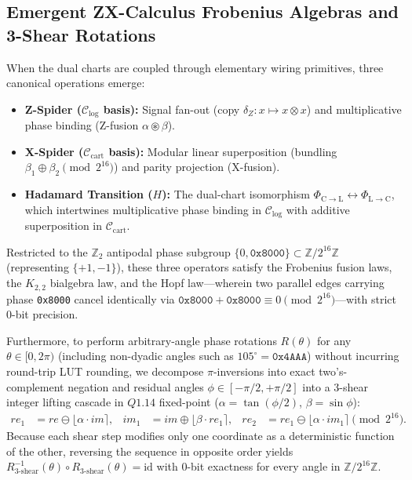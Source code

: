 \documentclass[11pt, a4paper]{article}
\begin{document}
\subsection{Emergent ZX-Calculus Frobenius Algebras and 3-Shear Rotations}
When the dual charts are coupled through elementary wiring primitives, three canonical operations emerge:
\begin{itemize}
    \item \textbf{Z-Spider ($\mathcal{C}_{\mathrm{log}}$ basis):} Signal fan-out (copy $\delta_Z: x \mapsto x \otimes x$) and multiplicative phase binding (Z-fusion $\alpha \circledast \beta$).
    \item \textbf{X-Spider ($\mathcal{C}_{\mathrm{cart}}$ basis):} Modular linear superposition (bundling $\beta_1 \oplus \beta_2 \pmod{2^{16}}$) and parity projection (X-fusion).
    \item \textbf{Hadamard Transition ($H$):} The dual-chart isomorphism $\Phi_{\mathrm{C}\to\mathrm{L}} \leftrightarrow \Phi_{\mathrm{L}\to\mathrm{C}}$, which intertwines multiplicative phase binding in $\mathcal{C}_{\mathrm{log}}$ with additive superposition in $\mathcal{C}_{\mathrm{cart}}$.
\end{itemize}
Restricted to the $\mathbb{Z}_2$ antipodal phase subgroup $\{0, \texttt{0x8000}\} \subset \mathbb{Z}/2^{16}\mathbb{Z}$ (representing $\{+1, -1\}$), these three operators satisfy the Frobenius fusion laws, the $K_{2,2}$ bialgebra law, and the Hopf law---wherein two parallel edges carrying phase \texttt{0x8000} cancel identically via $\texttt{0x8000} + \texttt{0x8000} \equiv 0 \pmod{2^{16}}$---with strict 0-bit precision.

Furthermore, to perform arbitrary-angle phase rotations $R(\theta)$ for any $\theta \in [0, 2\pi)$ (including non-dyadic angles such as $105^\circ = \texttt{0x4AAA}$) without incurring round-trip LUT rounding, we decompose $\pi$-inversions into exact two's-complement negation and residual angles $\phi \in [-\pi/2, +\pi/2]$ into a 3-shear integer lifting cascade in $Q1.14$ fixed-point ($\alpha = \tan(\phi/2)$, $\beta = \sin\phi$):
\begin{align*}
    re_1 &= re \ominus \lfloor \alpha \cdot im \rceil, &
    im_1 &= im \oplus \lfloor \beta \cdot re_1 \rceil, &
    re_2 &= re_1 \ominus \lfloor \alpha \cdot im_1 \rceil \pmod{2^{16}}.
\end{align*}
Because each shear step modifies only one coordinate as a deterministic function of the other, reversing the sequence in opposite order yields $R_{\text{3-shear}}^{-1}(\theta) \circ R_{\text{3-shear}}(\theta) = \mathrm{id}$ with 0-bit exactness for every angle in $\mathbb{Z}/2^{16}\mathbb{Z}$.
\end{document}
